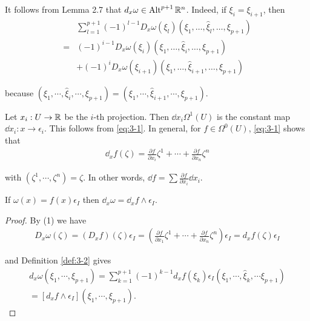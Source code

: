 It follows from Lemma 2.7 that $d_x\omega\in\operatorname{Alt}^{p+1}\mathbb{R}^n$. Indeed, if $\xi_i = \xi_{i+1}$, then 
\begin{align*}
    &\sum_{l=1}^{p+1}\left(-1\right)^{l-1}D_{x}\omega(\xi_{l})(\xi_{1},\ldots,\hat{\xi}_{l},\ldots,\xi_{p+1}) \\
  = & (-1)^{i-1}D_{x}\omega(\xi_{i})(\xi_{1},\ldots,\hat{\xi}_{i},\ldots,\xi_{p+1}) \\
    & +(-1)^{{i}}D_{{x}}\omega(\xi_{{i+1}})(\xi_{1},\ldots,\hat{\xi}_{{i+1}},\ldots,\xi_{{p+1}})
\end{align*}


because $(\xi_1, \cdots, \hat{\xi}_i, \cdots, \xi_{p+1}) = (\xi_1, \cdots, \hat{\xi}_{i+1}, \cdots, \xi_{p+1})$.

\begin{example}\label{example:3-3}
  Let $x_i:U\to \mathbb{R}$ be the $i$-th projection. Then $\dd x_i \Omega^1(U)$ is the
  constant map $\dd x_i:x\to \epsilon_i$. This follows from \eqref{eq:3-1}. In general, for $f\in\Omega^0(U)$,
  \eqref{eq:3-1} shows that
  \begin{align}\label{eq:3-2}
    \dd_x f(\zeta) = \frac{\partial f }{\partial x_i }\zeta^1 + \cdots + \frac{\partial f}{\partial x_n}\zeta^n
  \end{align}

  with $(\zeta^1, \cdots, \zeta^n) = \zeta$. In other words, $\dd f = \sum{\frac{\partial f}{\partial x_i}\dd x_i}$.  
\end{example}


\begin{lemma}\label{lemma:3-1}
  If $\omega(x) = f(x)\epsilon_I$ then $\dd_x\omega = \dd_xf\wedge\epsilon_I$.
\end{lemma}

\begin{proof}
  By (1) we have
  \begin{align*}
    D_x\omega(\zeta)
    = (D_xf)(\zeta)\epsilon_I
    = \left(\frac{\partial f}{\partial x_1}\zeta^1+\cdots+\frac{\partial f}{\partial x_n}\zeta^n\right)\epsilon_I
    = d_xf(\zeta)\epsilon_I
  \end{align*}

  and Definition \ref{def:3-2} gives
  \begin{align*}
    d_{x}\omega(\xi_{1},\cdots,\xi_{p+1}) 
    = \sum_{k=1}^{p+1}\left(-1\right)^{k-1}d_{x}f(\xi_{k})\epsilon_{I}\left(\xi_{1},\cdots,\hat{\xi}_{k},\cdots\xi_{p+1}\right) \\
    = [d_{x}f\wedge\epsilon_{I}](\xi_{1},\cdots,\xi_{p+1}). 
  \end{align*}
\end{proof}

